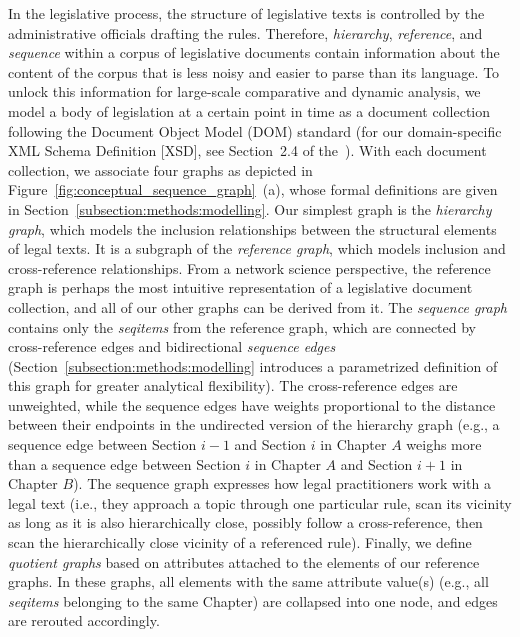 In the legislative process, 
the structure of legislative texts is controlled by the administrative officials drafting the rules. 
Therefore, \emph{hierarchy}, \emph{reference}, and \emph{sequence} within a corpus of legislative documents contain information about the content of the corpus 
that is less noisy and easier to parse than its language. 
To unlock this information for large-scale comparative and dynamic analysis, 
we model a body of legislation at a certain point in time as a document collection following the Document Object Model (DOM) standard \cite{domspec} (for our domain-specific XML Schema Definition [XSD], see Section~2.4 of the~\suppi). 
With each document collection, we associate four graphs 
as depicted in Figure~\ref{fig:conceptual_sequence_graph}~(a),
whose formal definitions are given in Section~\ref{subsection:methods:modelling}.
Our simplest graph is the \emph{hierarchy graph}, 
which models the inclusion relationships between the structural elements of legal texts. 
It is a subgraph of the \emph{reference graph}, which models inclusion and cross-reference relationships. 
From a network science perspective, the reference graph is perhaps the most intuitive representation of a legislative document collection, and all of our other graphs can be derived from it. 
The \emph{sequence graph} contains only the \emph{seqitems} from the reference graph, 
which are connected by cross-reference edges and bidirectional \emph{sequence edges} 
(Section~\ref{subsection:methods:modelling} introduces a parametrized definition of this graph for greater analytical flexibility). 
The cross-reference edges are unweighted, 
while the sequence edges have weights proportional to the distance between their endpoints in the undirected version of the hierarchy graph 
(e.g., a sequence edge between Section $i-1$ and Section $i$ in Chapter $A$ weighs more than a sequence edge between Section $i$ in Chapter $A$ and Section $i+1$ in Chapter $B$). 
The sequence graph expresses how legal practitioners work with a legal text (i.e., they approach a topic through one particular rule,
scan its vicinity as long as it is also hierarchically close,
possibly follow a cross-reference, 
then scan the hierarchically close vicinity of a referenced rule).
Finally, we define \emph{quotient graphs} based on attributes attached to the elements of our reference graphs. 
In these graphs, all elements with the same attribute value(s) (e.g., all \emph{seqitems} belonging to the same Chapter) are collapsed into one node, 
and edges are rerouted accordingly. 

